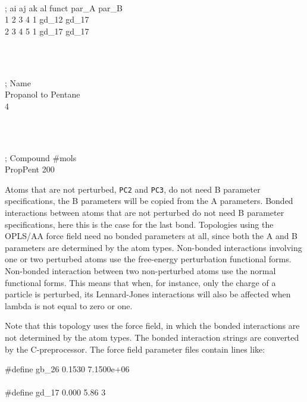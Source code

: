 \begin{tt}
[ dihedrals ]\\
;  ai    aj    ak    al funct    par\_A   par\_B\\
    1     2     3     4     1    gd\_12   gd\_17\\
    2     3     4     5     1    gd\_17   gd\_17\\
\end{tt}\\
\begin{tt}
[ system ]\\
; Name\\
Propanol to Pentane\\
4\end{tt}\\
\begin{tt}
[ molecules ]\\
; Compound        \#mols\\
PropPent            200\\
\end{tt}

Atoms that are not perturbed, {\tt PC2} and {\tt PC3}, do not need B parameter
specifications, the B parameters will be copied from the A parameters.
Bonded interactions between atoms that are not perturbed do not need B
parameter specifications, here this is the case for the last bond.
Topologies using the OPLS/AA force field need no bonded parameters at all,
since both the A and B parameters are determined by the atom types.
Non-bonded interactions involving one or two perturbed atoms use the 
free-energy perturbation functional forms.
Non-bonded interaction between two non-perturbed atoms use the normal
functional forms.
This means that when, for instance, only the charge of a particle is
perturbed, its Lennard-Jones interactions will also be affected when
lambda is not equal to zero or one.

Note that this topology uses the  force field, in which the bonded
interactions are not determined by the atom types. The bonded interaction
strings are converted by the C-preprocessor. The force field parameter
files contain lines like:

\begin{tt}
\#define gb\_26       0.1530  7.1500e+06\\
\\
\#define gd\_17     0.000       5.86          3\\
\end{tt}

